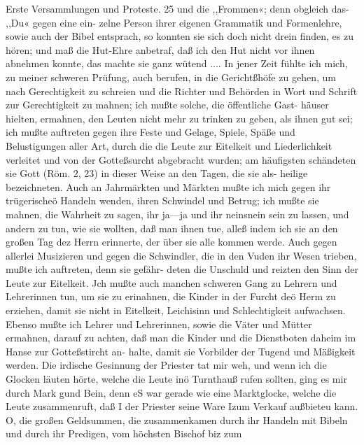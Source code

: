 Erste Versammlungen und Proteste. 25
und die ,,Frommen«; denn obgleich das- ,,Du« gegen eine ein-
zelne Person ihrer eigenen Grammatik und Formenlehre, sowie
auch der Bibel entsprach, so konnten sie sich doch nicht drein
finden, es zu hören; und maß die Hut-Ehre anbetraf, daß ich
den Hut nicht vor ihnen abnehmen konnte, das machte sie ganz
wütend ....
In jener Zeit fühlte ich mich, zu meiner schweren Prüfung,
auch berufen, in die Gerichtßhöfe zu gehen, um nach Gerechtigkeit
zu schreien und die Richter und Behörden in Wort und Schrift
zur Gerechtigkeit zu mahnen; ich mußte solche, die öffentliche Gast-
häuser hielten, ermahnen, den Leuten nicht mehr zu trinken zu
geben, als ihnen gut sei; ich mußte auftreten gegen ihre Feste
und Gelage, Spiele, Späße und Belustigungen aller Art, durch
die die Leute zur Eitelkeit und Liederlichkeit verleitet und von
der Gotteßsurcht abgebracht wurden; am häufigsten schändeten
sie Gott (Röm. 2, 23) in dieser Weise an den Tagen, die sie als-
heilige bezeichneten. Auch an Jahrmärkten und Märkten mußte
ich mich gegen ihr trügerischeö Handeln wenden, ihren Schwindel
und Betrug; ich mußte sie mahnen, die Wahrheit zu sagen, ihr
ja—ja und ihr neinsnein sein zu lassen, und andern zu tun, wie
sie wollten, daß man ihnen tue, alleß indem ich sie an den großen
Tag dez Herrn erinnerte, der über sie alle kommen werde. Auch
gegen allerlei Musizieren und gegen die Schwindler, die in den
Vuden ihr Wesen trieben, mußte ich auftreten, denn sie gefähr-
deten die Unschuld und reizten den Sinn der Leute zur Eitelkeit.
Jch mußte auch manchen schweren Gang zu Lehrern und Lehrerinnen
tun, um sie zu erinahnen, die Kinder in der Furcht deö Herm zu
erziehen, damit sie nicht in Eitelkeit, Leichisinn und Schlechtigkeit
aufwachsen. Ebenso mußte ich Lehrer und Lehrerinnen, sowie die
Väter und Mütter ermahnen, darauf zu achten, daß man die
Kinder und die Dienstboten daheim im Hanse zur Gotteßstircht an-
halte, damit sie Vorbilder der Tugend und Mäßigkeit werden.
Die irdische Gesinnung der Priester tat mir weh, und wenn
ich die Glocken läuten hörte, welche die Leute inö Turnthauß
rufen sollten, ging es mir durch Mark gund Bein, denn eS war
gerade wie eine Marktglocke, welche die Leute zusammenruft, daß I
der Priester seine Ware Izum Verkauf außbieteu kann. O, die
großen Geldsummen, die zusammenkamen durch ihr Handeln mit
Bibeln und durch ihr Predigen, vom höchsten Bischof biz zum


